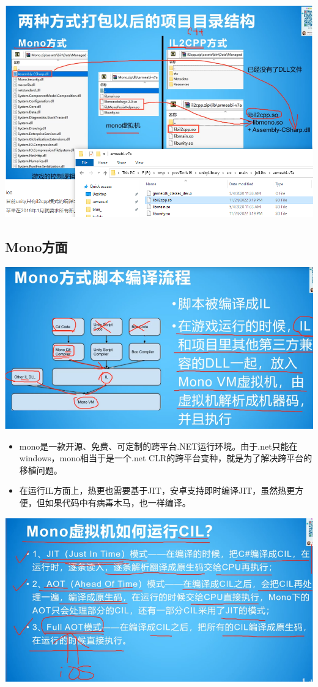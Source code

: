 \documentclass[9pt, b5paper]{article}
\begin{document}
\includegraphics[width=.9\linewidth]{./pic/notes_20221125_094114.png}
\subsection{Mono方面}
\label{sec-4-1}

\includegraphics[width=.9\linewidth]{./pic/notes_20221125_094154.png}
\begin{itemize}
\item mono是一款开源、免费、可定制的跨平台.NET运行环境。由于.net只能在windows，mono相当于是一个.net CLR的跨平台变种，就是为了解决跨平台的移植问题。
\item 在运行IL方面上，热更也需要基于JIT，安卓支持即时编译JIT，虽然热更方便，但如果代码中有病毒木马，也一样编译。
\end{itemize}

\includegraphics[width=.9\linewidth]{./pic/notes_20221125_094222.png}
\end{document}
